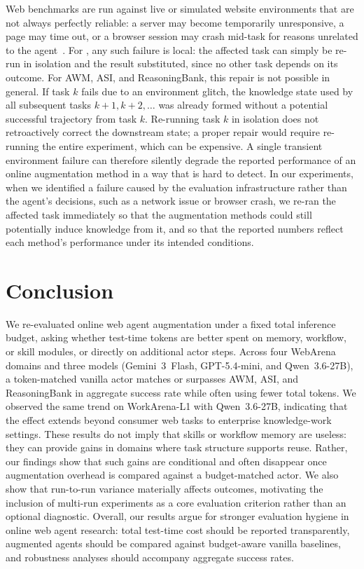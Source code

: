  Web benchmarks are run against live or simulated website environments that are not always perfectly reliable: a server may become temporarily unresponsive, a page may time out, or a browser session may crash mid-task for reasons unrelated to the agent~\citep{kara-etal-2025-waber}.
For \budgetactor{}, any such failure is local: the affected task can simply be re-run in isolation and the result substituted, since no other task depends on its outcome.
For AWM, ASI, and ReasoningBank, this repair is not possible in general.
If task $k$ fails due to an environment glitch, the knowledge state used by all subsequent tasks $k{+}1, k{+}2, \ldots$ was already formed without a potential successful trajectory from task $k$.
Re-running task $k$ in isolation does not retroactively correct the downstream state; a proper repair would require re-running the entire experiment, which can be expensive.
A single transient environment failure can therefore silently degrade the reported performance of an online augmentation method in a way that is hard to detect.
In our experiments, when we identified a failure caused by the evaluation infrastructure rather than the agent's decisions, such as a network issue or browser crash, we re-ran the affected task immediately so that the augmentation methods could still potentially induce knowledge from it, and so that the reported numbers reflect each method's performance under its intended conditions.


\section{Conclusion}

We re-evaluated online web agent augmentation under a fixed total inference budget, asking whether test-time tokens are better spent on memory, workflow, or skill modules, or directly on additional actor steps. Across four WebArena domains and three models (Gemini~3~Flash, GPT-5.4-mini, and Qwen~3.6-27B), a token-matched vanilla actor matches or surpasses AWM, ASI, and ReasoningBank in aggregate success rate while often using fewer total tokens. We observed the same trend on WorkArena-L1 with Qwen~3.6-27B, indicating that the effect extends beyond consumer web tasks to enterprise knowledge-work settings. These results do not imply that skills or workflow memory are useless: they can provide gains in domains where task structure supports reuse. Rather, our findings show that such gains are conditional and often disappear once augmentation overhead is compared against a budget-matched actor. We also show that run-to-run variance materially affects outcomes, motivating the inclusion of multi-run experiments as a core evaluation criterion rather than an optional diagnostic. Overall, our results argue for stronger evaluation hygiene in online web agent research: total test-time cost should be reported transparently, augmented agents should be compared against budget-aware vanilla baselines, and robustness analyses should accompany aggregate success rates.


